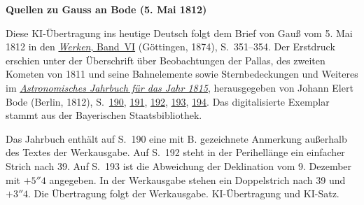 \clearpage\thispagestyle{empty}
\begin{center}\textbf{Quellen zu Gauss an Bode (5. Mai 1812)}\end{center}
\noindent Diese KI-Übertragung ins heutige Deutsch folgt dem Brief von Gauß vom 5. Mai 1812 in den \href{https://gdz.sub.uni-goettingen.de/id/PPN236007467}{\textit{Werken}, Band~VI} (Göttingen, 1874), S.~351--354. Der Erstdruck erschien unter der Überschrift über Beobachtungen der Pallas, des zweiten Kometen von 1811 und seine Bahnelemente sowie Sternbedeckungen und Weiteres im \href{https://api.digitale-sammlungen.de/iiif/image/v2/bsb10538344_00005/full/1600,/0/default.jpg}{\textit{Astronomisches Jahrbuch für das Jahr 1815}}, herausgegeben von Johann Elert Bode (Berlin, 1812), S.~\href{https://api.digitale-sammlungen.de/iiif/image/v2/bsb10538344_00198/full/1600,/0/default.jpg}{190}, \href{https://api.digitale-sammlungen.de/iiif/image/v2/bsb10538344_00199/full/1600,/0/default.jpg}{191}, \href{https://api.digitale-sammlungen.de/iiif/image/v2/bsb10538344_00200/full/1600,/0/default.jpg}{192}, \href{https://api.digitale-sammlungen.de/iiif/image/v2/bsb10538344_00201/full/1600,/0/default.jpg}{193}, \href{https://api.digitale-sammlungen.de/iiif/image/v2/bsb10538344_00202/full/1600,/0/default.jpg}{194}. Das digitalisierte Exemplar stammt aus der Bayerischen Staatsbibliothek.
\par\smallskip\noindent Das Jahrbuch enthält auf S.~190 eine mit B. gezeichnete Anmerkung außerhalb des Textes der Werkausgabe. Auf S.~192 steht in der Perihellänge ein einfacher Strich nach 39. Auf S.~193 ist die Abweichung der Deklination vom 9. Dezember mit $+5''4$ angegeben. In der Werkausgabe stehen ein Doppelstrich nach 39 und $+3''4$. Die Übertragung folgt der Werkausgabe. KI-Übertragung und KI-Satz.
\clearpage
